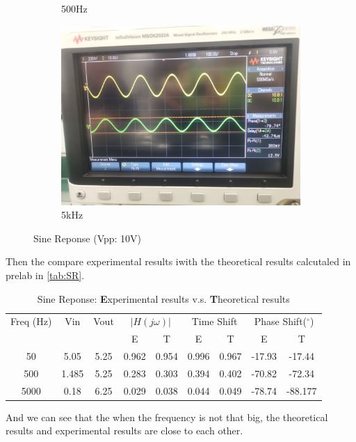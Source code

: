 \documentclass[a4paper]{article}
\begin{document}
\begin{figure}[h]
\begin{subfigure}{0.326\textwidth}
            \caption{500Hz}
        \end{subfigure}
        \begin{subfigure}{0.32\textwidth}
            \includegraphics[width=\textwidth, trim={0 1cm 7cm 1cm}, clip]{5000.jpg}
            \caption{5kHz}
        \end{subfigure}
        \caption{Sine Reponse (Vpp: 10V)}
        \label{fig:SR}
    \end{figure}
    Then the compare experimental results iwith the theoretical results calcutaled in prelab in \autoref{tab:SR}.
    \begin{table}[h]
        \centering
        \begin{tabular}{|ccccccccc|}
            \hline
            Freq (Hz) & Vin & Vout & \multicolumn{2}{c}{$|H(j\omega)|$} & \multicolumn{2}{c}{Time Shift}(ms) & \multicolumn{2}{c|}{Phase Shift($^{\circ}$)} \\
              & & & E & T & E & T & E & T \\
            \hline
            50 & 5.05 & 5.25 & 0.962 & 0.954 & 0.996 & 0.967 & -17.93 & -17.44\\
            500 & 1.485 & 5.25 & 0.283 & 0.303 & 0.394 & 0.402 & -70.82 & -72.34\\
            5000 & 0.18 & 6.25 & 0.029 & 0.038 & 0.044 & 0.049 & -78.74 & -88.177\\
            \hline
        \end{tabular}
        \caption{Sine Reponse: \textbf{E}xperimental results v.s. \textbf{T}heoretical results}
        \label{tab:SR}
    \end{table}
    And we can see that the when the frequency is not that big, the theoretical results and experimental results are close to each other.
\end{document}
